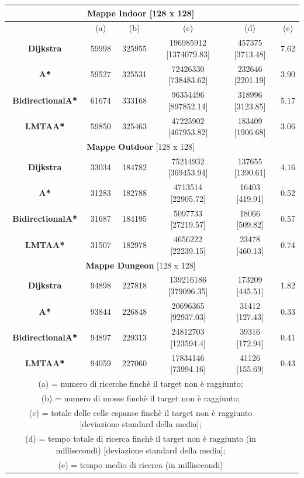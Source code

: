 \documentclass[11pt]{book}
\begin{document}
{\begin{table}[H]
{\begin{tabular}{c|c|c|c|c|c|}
\hline
\multicolumn{5}{c}{\textbf{Mappe Indoor} [128 x 128]}\\
\hline 
	 & (a) & (b) & (c) & (d) & (e)\\
\hline
	\textbf{Dijkstra} & 59998 & 325955 & 196985912 [1374079.83] & 457375 [3713.48] & 7.62\\
\hline
	\textbf{A\^*} & 59527 & 325531 & 72426330 [738483.62] & 232646 [2201.19] & 3.90\\
\hline
	\textbf{BidirectionalA\^*} & 61674 & 333168 & 96354496 [897852.14] & 318996 [3123.85]& 5.17\\
\hline
	\textbf{LMTAA\^*} & 59850 & 325463 & 47225902 [467953.82] & 183409 [1906.68] & 3.06\\ \hline 
	\multicolumn{5}{c}{\textbf{Mappe Outdoor} [128 x 128]}\\
\hline
	\textbf{Dijkstra} & 33034 & 184782 & 75214932 [369453.94] & 137655 [1390.61] & 4.16\\
\hline
	\textbf{A\^*} & 31283 & 182788 & 4713514 [22905.72] & 16403 [419.91] & 0.52\\
\hline
	\textbf{BidirectionalA\^*} & 31687 & 184195 & 5097733 [27219.57] & 18066 [509.82]& 0.57\\
\hline
	\textbf{LMTAA\^*} & 31507 & 182978 & 4656222 [22239.15] & 23478 [460.13] & 0.74\\ \hline 
		\multicolumn{5}{c}{\textbf{Mappe Dungeon} [128 x 128]}\\
\hline
	\textbf{Dijkstra} & 94898 & 227818 & 139216186 [379096.35] & 173209 [445.51] & 1.82\\
\hline
	\textbf{A\^*} & 93844 & 226848 & 20696365 [92937.03] & 31412 [127.43] & 0.33\\
\hline
	\textbf{BidirectionalA\^*} & 94897 & 229313 & 24812703 [123594.4] & 39316 [172.94]& 0.41\\
\hline
	\textbf{LMTAA\^*} & 94059 & 227060 & 17834146 [73994.16] & 41126 [155.69] & 0.43\\ \hline 
			\multicolumn{5}{c}{(a) = numero di ricerche finch\`e il target non \`e raggiunto;} \\ \multicolumn{5}{c}{(b) = numero di mosse finch\`e il target non \`e raggiunto;} \\ \multicolumn{5}{c}{(c) = totale delle celle espanse finch\`e  il target non \`e raggiunto [deviazione standard della media];} \\ \multicolumn{5}{c}{(d) = tempo totale di ricerca finch\`e il target non \`e raggiunto (in millisecondi) [deviazione standard della media];} \\ \multicolumn{5}{c}{(e) = tempo medio di ricerca (in millisecondi) }\\


\end{tabular}}
\end{table}}
\end{document}
